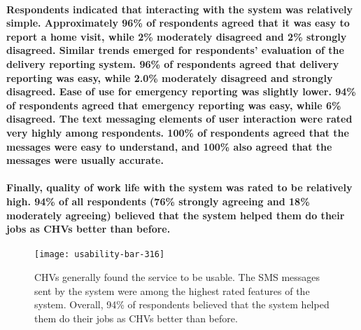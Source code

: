 \paragraph{Respondents indicated that interacting with the system was relatively simple.  Approximately 96\% of respondents agreed that it was easy to report a home visit, while 2\% moderately disagreed and 2\% strongly disagreed. Similar trends emerged for respondents' evaluation of the delivery reporting system. 96\% of respondents  agreed that delivery reporting was easy, while 2.0\% moderately disagreed and strongly disagreed. Ease of use for emergency reporting was slightly lower. 94\% of respondents agreed that emergency reporting was easy, while 6\% disagreed. The text messaging elements of user interaction were rated very highly among respondents. 100\% of respondents agreed that the messages were easy to understand, and 100\% also agreed that the messages were usually accurate.}

\paragraph{Finally, quality of work life with the system was rated to be relatively high. 94\% of all respondents (76\% strongly agreeing and 18\% moderately agreeing) believed that the system helped them do their jobs as CHVs better than before.}


\begin{figure}[h]
	\begin{center}
	\texttt{[image: usability-bar-316]}
	\end{center}
	\caption[Usability survey results]{CHVs generally found the service to be usable. The SMS messages sent by the system were among the highest rated features of the system. Overall, 94\% of respondents believed that the system helped them do their jobs as CHVs better than before.}
	\label{fig:barchart}
\end{figure}

